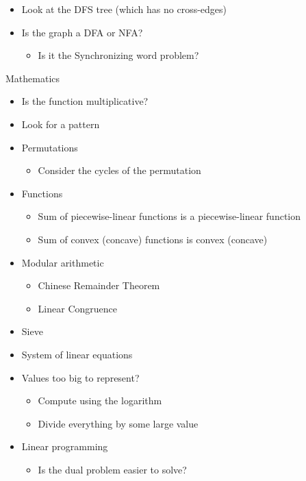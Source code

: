 \begin{myitemize}
\begin{itemize}
          \item Look at the DFS tree (which has no cross-edges)
          \item Is the graph a DFA or NFA?
              \begin{itemize}
                \item Is it the Synchronizing word problem?
              \end{itemize}
        \end{itemize}
      \item Mathematics
        \begin{itemize}
          \item Is the function multiplicative?
          \item Look for a pattern
          \item Permutations
            \begin{itemize}
              \item Consider the cycles of the permutation
            \end{itemize}
          \item Functions
            \begin{itemize}
              \item Sum of piecewise-linear functions is a piecewise-linear function
              \item Sum of convex (concave) functions is convex (concave)
            \end{itemize}
          \item Modular arithmetic
            \begin{itemize}
              \item Chinese Remainder Theorem
              \item Linear Congruence
            \end{itemize}
          \item Sieve
          \item System of linear equations
          \item Values too big to represent?
            \begin{itemize}
              \item Compute using the logarithm
              \item Divide everything by some large value
            \end{itemize}
          \item Linear programming
            \begin{itemize}
              \item Is the dual problem easier to solve?

\end{itemize}
\end{itemize}
\end{myitemize}
